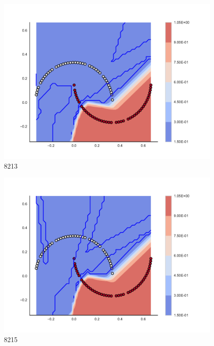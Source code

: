 \begin{subfigure}[b]{0.09\textwidth}
    \includegraphics[clip, trim=2.35cm 1.75cm 4.5cm 0cm,width=\textwidth]{img/convergence/8213.pdf}
    \caption{8213}
    \label{fig:convergence_8213}
\end{subfigure}
%
\begin{subfigure}[b]{0.09\textwidth}
    \includegraphics[clip, trim=2.35cm 1.75cm 4.5cm 0cm,width=\textwidth]{img/convergence/8215.pdf}
    \caption{8215}
    \label{fig:convergence_8215}
\end{subfigure}
%
